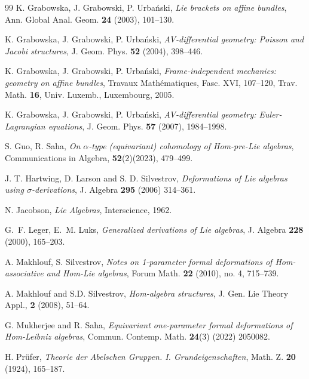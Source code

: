 \documentclass[14pt]{article}
\theoremstyle{Definition}
\theoremstyle{remark}
\begin{document}
\begin{thebibliography}{99}
K. Grabowska, J. Grabowski, P. Urba\'nski,
\textit{Lie brackets on affine bundles},
Ann. Global Anal. Geom. \textbf{24} (2003), 101--130.

K. Grabowska, J. Grabowski, P. Urba\'nski,
\textit{AV-differential geometry: Poisson and Jacobi structures},
J. Geom. Phys. \textbf{52} (2004), 398--446.

K. Grabowska, J. Grabowski, P. Urba\'nski,
\textit{Frame-independent mechanics: geometry on affine bundles},
Travaux Math\'ematiques, Fasc. XVI, 107--120,
Trav. Math. \textbf{16}, Univ. Luxemb., Luxembourg, 2005.

K. Grabowska, J. Grabowski, P. Urba\'nski,
\textit{AV-differential geometry: Euler-Lagrangian equations},
J. Geom. Phys. \textbf{57} (2007), 1984--1998.

S. Guo, R. Saha, \textit{On $\alpha$-type (equivariant) cohomology of Hom-pre-Lie algebras}, Communications in Algebra, \textbf{52}(2)(2023), 479–499.

J. T. Hartwing, D. Larson and S. D. Silvestrov, \textit{Deformations of Lie algebras using
$\sigma$-derivations}, J. Algebra \textbf{295} (2006) 314--361.

N. Jacobson,
\textit{Lie Algebras},
Interscience, 1962.

G.~F. Leger, E.~M. Luks,
\textit{Generalized derivations of Lie algebras},
J. Algebra \textbf{228} (2000), 165--203.


A. Makhlouf, S. Silvestrov, \textit{Notes on 1-parameter formal deformations of Hom-associative and Hom-Lie algebras}, Forum Math. \textbf{22} (2010), no. 4, 715--739.

A. Makhlouf and S.D. Silvestrov, \textit{Hom-algebra structures}, J. Gen. Lie Theory Appl., \textbf{2} (2008), 51--64.

G. Mukherjee and R. Saha, \textit{Equivariant one-parameter formal deformations of Hom-Leibniz algebras}, Commun. Contemp. Math. \textbf{24}(3) (2022) 2050082.


H. Pr\"ufer,
\textit{Theorie der Abelschen Gruppen. I. Grundeigenschaften},
Math. Z. \textbf{20} (1924), 165--187.


\end{thebibliography}
\end{document}
